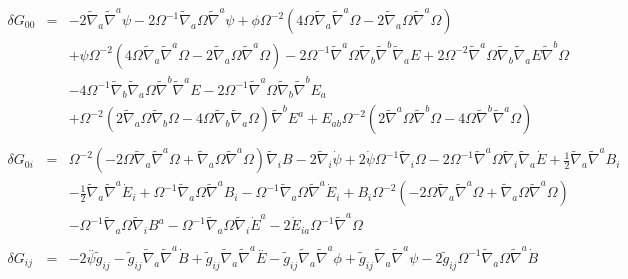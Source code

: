 \documentclass[10pt,letterpaper]{article}
\numberwithin{equation}{section}
\begin{document}
\begin{eqnarray}
\delta G_{00}&=& -2 \tilde{\nabla}_{a}\tilde{\nabla}^{a}\psi - 2 \Omega^{-1} \tilde{\nabla}_{a}\Omega \tilde{\nabla}^{a}\psi + \phi \Omega^{-2} (4 \Omega \tilde{\nabla}_{a}\tilde{\nabla}^{a}\Omega - 2 \tilde{\nabla}_{a}\Omega \tilde{\nabla}^{a}\Omega) \nonumber \\ 
&& + \psi \Omega^{-2} (4 \Omega \tilde{\nabla}_{a}\tilde{\nabla}^{a}\Omega - 2 \tilde{\nabla}_{a}\Omega \tilde{\nabla}^{a}\Omega) - 2 \Omega^{-1} \tilde{\nabla}^{a}\Omega \tilde{\nabla}_{b}\tilde{\nabla}^{b}\tilde{\nabla}_{a}E + 2 \Omega^{-2} \tilde{\nabla}^{a}\Omega \tilde{\nabla}_{b}\tilde{\nabla}_{a}E \tilde{\nabla}^{b}\Omega \nonumber \\ 
&& - 4 \Omega^{-1} \tilde{\nabla}_{b}\tilde{\nabla}_{a}\Omega \tilde{\nabla}^{b}\tilde{\nabla}^{a}E-2 \Omega^{-1} \tilde{\nabla}^{a}\Omega \tilde{\nabla}_{b}\tilde{\nabla}^{b}E_{a} \nonumber \\ 
&& + \Omega^{-2} (2 \tilde{\nabla}_{a}\Omega \tilde{\nabla}_{b}\Omega - 4 \Omega \tilde{\nabla}_{b}\tilde{\nabla}_{a}\Omega) \tilde{\nabla}^{b}E^{a}+E_{ab} \Omega^{-2} (2 \tilde{\nabla}^{a}\Omega \tilde{\nabla}^{b}\Omega - 4 \Omega \tilde{\nabla}^{b}\tilde{\nabla}^{a}\Omega)
\\  \nonumber\\ 
\delta G_{0i}&=& \Omega^{-2} (-2 \Omega \tilde{\nabla}_{a}\tilde{\nabla}^{a}\Omega + \tilde{\nabla}_{a}\Omega \tilde{\nabla}^{a}\Omega) \tilde{\nabla}_{i}B - 2 \tilde{\nabla}_{i}\dot{\psi} + 2 \dot{\psi} \Omega^{-1} \tilde{\nabla}_{i}\Omega - 2 \Omega^{-1} \tilde{\nabla}^{a}\Omega \tilde{\nabla}_{i}\tilde{\nabla}_{a}\dot{E}+\tfrac{1}{2} \tilde{\nabla}_{a}\tilde{\nabla}^{a}B_{i} \nonumber \\ 
&& -  \tfrac{1}{2} \tilde{\nabla}_{a}\tilde{\nabla}^{a}\dot{E}_{i} + \Omega^{-1} \tilde{\nabla}_{a}\Omega \tilde{\nabla}^{a}B_{i} -  \Omega^{-1} \tilde{\nabla}_{a}\Omega \tilde{\nabla}^{a}\dot{E}_{i} + B_{i} \Omega^{-2} (-2 \Omega \tilde{\nabla}_{a}\tilde{\nabla}^{a}\Omega + \tilde{\nabla}_{a}\Omega \tilde{\nabla}^{a}\Omega) \nonumber \\ 
&& -  \Omega^{-1} \tilde{\nabla}_{a}\Omega \tilde{\nabla}_{i}B^{a} -  \Omega^{-1} \tilde{\nabla}_{a}\Omega \tilde{\nabla}_{i}\dot{E}^{a}-2 \dot{E}_{ia} \Omega^{-1} \tilde{\nabla}^{a}\Omega 
\\  \nonumber\\ 
\delta G_{ij}&=& -2 \overset{..}{\psi} \tilde{g}_{ij} -  \tilde{g}_{ij} \tilde{\nabla}_{a}\tilde{\nabla}^{a}\dot{B} + \tilde{g}_{ij} \tilde{\nabla}_{a}\tilde{\nabla}^{a}\overset{..}{E} -  \tilde{g}_{ij} \tilde{\nabla}_{a}\tilde{\nabla}^{a}\phi + \tilde{g}_{ij} \tilde{\nabla}_{a}\tilde{\nabla}^{a}\psi - 2 \tilde{g}_{ij} \Omega^{-1} \tilde{\nabla}_{a}\Omega \tilde{\nabla}^{a}\dot{B} \nonumber \\ 

\end{eqnarray}
\end{document}
